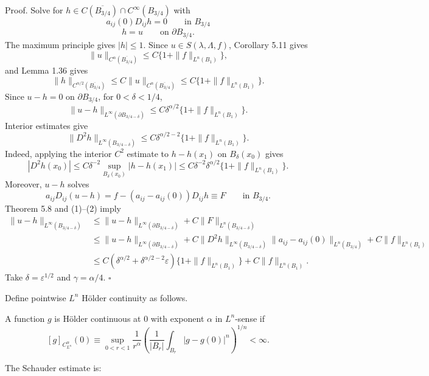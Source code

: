 Proof. \sketch Solve for $h\in C(\overline{B_{3/4}})\cap C^\infty(B_{3/4})$ with
\[
a_{ij}(0)D_{ij}h=0 \qquad \text{in } B_{3/4}
\]
\[
h=u \qquad \text{on } \partial B_{3/4}.
\]
The maximum principle gives $|h|\le1$. Since $u\in S(\lambda,\Lambda,f)$, Corollary 5.11 gives
\[
\|u\|_{C^\alpha(\overline{B_{3/4}})}\leq C\{1+\|f\|_{L^n(B_1)}\},
\]
and Lemma 1.36 gives
\[
\|h\|_{C^{\alpha/2}(\overline{B_{3/4}})}\leq C\|u\|_{C^\alpha(\overline{B_{3/4}})}\leq C\{1+\|f\|_{L^n(B_1)}\}.
\]
Since $u-h=0$ on $\partial B_{3/4}$, for $0<\delta<1/4$,
\[
\tag{1}
\|u-h\|_{L^\infty(\partial B_{3/4-\delta})}\leq C\delta^{\alpha/2}\{1+\|f\|_{L^n(B_1)}\}.
\]
Interior estimates give
\[
\tag{2}
\|D^2 h\|_{L^\infty(B_{3/4-\delta})}\leq C\delta^{\alpha/2-2}\{1+\|f\|_{L^n(B_1)}\}.
\]
Indeed, applying the interior $C^2$ estimate to $h-h(x_1)$ on $B_\delta(x_0)$ gives
\[
|D^2 h(x_0)|\leq C\delta^{-2}\sup_{B_\delta(x_0)}|h-h(x_1)|\leq C\delta^{-2}\delta^{\alpha/2}\{1+\|f\|_{L^n(B_1)}\}.
\]
Moreover, $u-h$ solves
\[
a_{ij}D_{ij}(u-h)=f-(a_{ij}-a_{ij}(0))D_{ij}h\equiv F \qquad \text{in } B_{3/4}.
\]
Theorem 5.8 and (1)--(2) imply
\begin{align*}
\|u-h\|_{L^\infty(B_{3/4-\delta})}
&\leq \|u-h\|_{L^\infty(\partial B_{3/4-\delta})}+C\|F\|_{L^n(B_{3/4-\delta})}\\
&\leq \|u-h\|_{L^\infty(\partial B_{3/4-\delta})}+C\|D^2 h\|_{L^\infty(B_{3/4-\delta})}\|a_{ij}-a_{ij}(0)\|_{L^n(B_{3/4})}+C\|f\|_{L^n(B_1)}\\
&\leq C(\delta^{\alpha/2}+\delta^{\alpha/2-2}\varepsilon)\{1+\|f\|_{L^n(B_1)}\}+C\|f\|_{L^n(B_1)}.
\end{align*}
Take $\delta=\varepsilon^{1/2}$ and $\gamma=\alpha/4$. $\square$

Define pointwise $L^n$ Hölder continuity as follows.

\begin{definition}\label{hanlin:ch05-def-5-19} A function $g$ is Hölder continuous at $0$ with exponent $\alpha$ in
$L^n$-sense if
\[
[g]_{C^\alpha_{L^n}}(0)\equiv \sup_{0<r<1}\frac{1}{r^\alpha}\left(\frac{1}{|B_r|}\int_{B_r}|g-g(0)|^n\right)^{1/n}<\infty.
\]
\end{definition}

The Schauder estimate is:

